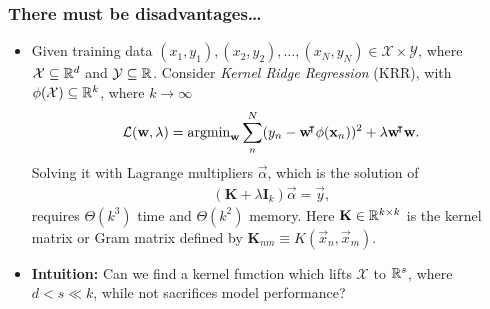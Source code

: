 \documentclass[10pt]{../formats/RU}
\begin{document}
\begin{frame}
  \frametitle{There must be disadvantages\ldots}
  \begin{itemize}
    \item <1-> Given training data $(x_1, y_1), (x_2, y_2), \ldots, (x_N, y_N) \in \mathcal{X}\times\mathcal{Y}$, where $\mathcal{X}\subseteq \mathbb{R}^d$ and $\mathcal{Y}\subseteq\mathbb{R}$. Consider \emph{Kernel Ridge Regression} (KRR), with $\phi(\mathcal{X})\subseteq \mathbb{R}^k$, where $k\rightarrow\infty$
    \begin{align*}
      \mathcal{L}(\mathbf{w}, \lambda)=\operatorname{\mathrm{argmin}}_{\mathbf{w}}\sum_{n}^{N}(y_n - \mathbf{w}{}^{\mkern-4mu\intercal}\phi(\mathbf{x}_n))^2 + \lambda\mathbf{w}{}^{\mkern-4mu\intercal}\mathbf{w}.
    \end{align*}
    Solving it with Lagrange multipliers $\vec{\alpha}$, which is the solution of
    \begin{align*}%
      (\mathbf{K}+\lambda\mathbf{I}_k)\vec{\alpha} = \vec{y},
    \end{align*} 
    requires $\Theta(k^3)$ time and $\Theta(k^2)$ memory. Here $\mathbf{K}\in \mathbb{R}^{k\times k}$ is the kernel matrix or Gram matrix defined by $\mathbf{K}_{nm} \equiv K(\vec{x}_n, \vec{x}_m)$.
    \item <2-> \textbf{Intuition:} Can we find a kernel function which lifts $\mathcal{X}$ to $\mathbb{R}^s$, where $d < s\ll k$, while not sacrifices model performance?
  \end{itemize}
\end{frame}
\end{document}
